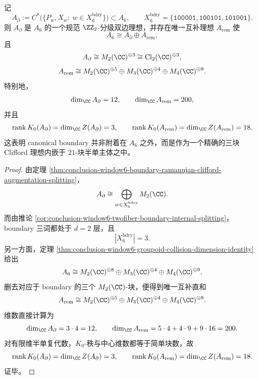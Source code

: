 \begin{theorem}\label{thm:conclusion-window6-boundary-clifford-ideal-exact-12-plus-200-splitting}
记
\[
A_{\partial}:=
C^\ast\!\bigl(\{P_w,X_w:\ w\in X_6^{\mathrm{bdry}}\}\bigr)\subset A_6,
\qquad
X_6^{\mathrm{bdry}}=\{\texttt{100001},\texttt{100101},\texttt{101001}\}.
\]
则 \(A_{\partial}\) 是 \(A_6\) 的一个规范 \(\ZZ_2\)-分级双边理想，并存在唯一互补理想 \(A_{\mathrm{rem}}\) 使
\[
A_6\cong A_{\partial}\oplus A_{\mathrm{rem}},
\]
且
\[
A_{\partial}\cong M_2(\CC)^{\oplus 3}\cong \mathrm{Cl}_2(\CC)^{\oplus 3},
\]
\[
A_{\mathrm{rem}}\cong M_2(\CC)^{\oplus 5}\oplus M_3(\CC)^{\oplus 4}\oplus M_4(\CC)^{\oplus 9}.
\]
特别地，
\[
\dim_{\CC}A_{\partial}=12,
\qquad
\dim_{\CC}A_{\mathrm{rem}}=200,
\]
并且
\[
\operatorname{rank}K_0(A_{\partial})=\dim_{\CC}Z(A_{\partial})=3,
\qquad
\operatorname{rank}K_0(A_{\mathrm{rem}})=\dim_{\CC}Z(A_{\mathrm{rem}})=18.
\]
这表明 canonical boundary 并非附着在 \(A_6\) 之外，而是作为一个精确的三块 Clifford 理想内嵌于 \(21\)-块半单主体之中。
\end{theorem}

\begin{proof}
由定理 \ref{thm:conclusion-window6-boundary-ramanujan-clifford-augmentation-splitting}，
\[
A_{\partial}\cong \bigoplus_{w\in X_6^{\mathrm{bdry}}}M_2(\CC).
\]
而由推论 \ref{cor:conclusion-window6-twofiber-boundary-internal-splitting}，boundary 三词都处于 \(d=2\) 层，且
\[
|X_6^{\mathrm{bdry}}|=3.
\]
另一方面，定理 \ref{thm:conclusion-window6-groupoid-collision-dimension-identity} 给出
\[
A_6\cong M_2(\CC)^{\oplus 8}\oplus M_3(\CC)^{\oplus 4}\oplus M_4(\CC)^{\oplus 9}.
\]
删去对应于 boundary 的三个 \(M_2(\CC)\)-块，便得到唯一互补直和
\[
A_{\mathrm{rem}}\cong M_2(\CC)^{\oplus 5}\oplus M_3(\CC)^{\oplus 4}\oplus M_4(\CC)^{\oplus 9}.
\]
维数直接计算为
\[
\dim_{\CC}A_{\partial}=3\cdot 4=12,
\qquad
\dim_{\CC}A_{\mathrm{rem}}=5\cdot 4+4\cdot 9+9\cdot 16=200.
\]
对有限维半单复代数，\(K_0\)-秩与中心维数都等于简单块数，故
\[
\operatorname{rank}K_0(A_{\partial})=\dim_{\CC}Z(A_{\partial})=3,
\qquad
\operatorname{rank}K_0(A_{\mathrm{rem}})=\dim_{\CC}Z(A_{\mathrm{rem}})=18.
\]
证毕。
\end{proof}

